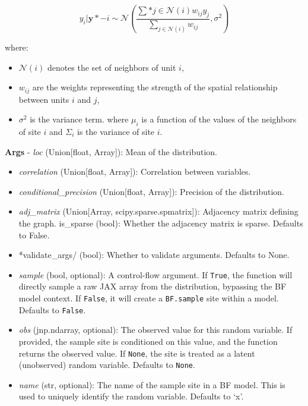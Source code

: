 \documentclass[
  letterpaper,
  DIV=11,
  numbers=noendperiod]{scrartcl}
\providecommand{\tightlist}{%
  \setlength{\itemsep}{0pt}\setlength{\parskip}{0pt}}\usepackage{longtable,booktabs,array}
\begin{document}
\[
y_i | \mathbf{y}*{-i} \sim \mathcal{N}\left( \frac{\sum*{j \in \mathcal{N}(i)} w_{ij} y_j}{\sum_{j \in \mathcal{N}(i)} w_{ij}}, \sigma^2 \right)
\]

where:

\begin{itemize}
\tightlist
\item
  \(\mathcal{N}(i)\) denotes the set of neighbors of unit \(i\),
\item
  \(w_{ij}\) are the weights representing the strength of the spatial
  relationship between units \(i\) and \(j\),
\item
  \(\sigma^2\) is the variance term. where \(\mu_i\) is a function of
  the values of the neighbors of site \(i\) and \(\Sigma_i\) is the
  variance of site \(i\).
\end{itemize}

\textbf{Args} - \emph{loc} (Union{[}float, Array{]}): Mean of the
distribution.

\begin{itemize}
\item
  \emph{correlation} (Union{[}float, Array{]}): Correlation between
  variables.
\item
  \emph{conditional\_precision} (Union{[}float, Array{]}): Precision of
  the distribution.
\item
  \emph{adj\_matrix} (Union{[}Array, scipy.sparse.spmatrix{]}):
  Adjacency matrix defining the graph. is\_sparse (bool): Whether the
  adjacency matrix is sparse. Defaults to False.
\item
  *validate\_args/ (bool): Whether to validate arguments. Defaults to
  None.
\item
  \emph{sample} (bool, optional): A control-flow argument. If
  \texttt{True}, the function will directly sample a raw JAX array from
  the distribution, bypassing the BF model context. If \texttt{False},
  it will create a \texttt{BF.sample} site within a model. Defaults to
  \texttt{False}.
\item
  \emph{obs} (jnp.ndarray, optional): The observed value for this random
  variable. If provided, the sample site is conditioned on this value,
  and the function returns the observed value. If \texttt{None}, the
  site is treated as a latent (unobserved) random variable. Defaults to
  \texttt{None}.
\item
  \emph{name} (str, optional): The name of the sample site in a BF
  model. This is used to uniquely identify the random variable. Defaults
  to `x'.
\end{itemize}
\end{document}
